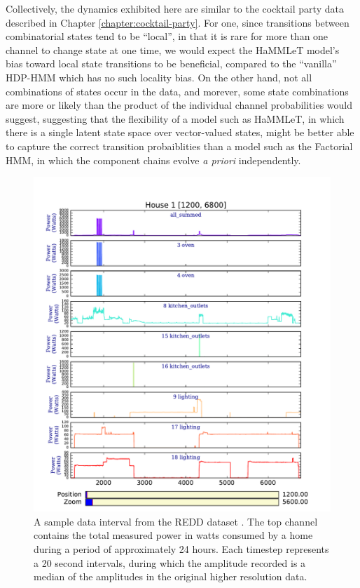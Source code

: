 Collectively, the dynamics exhibited here are similar to the cocktail party data described in Chapter \ref{chapter:cocktail-party}.  For one, since transitions between combinatorial states tend to be ``local'', in that it is rare for more than one channel to change state at one time, we would expect the HaMMLeT model's bias toward local state transitions to be beneficial, compared to the ``vanilla'' HDP-HMM which has no such locality bias.  On the other hand, not all combinations of states occur in the data, and morever, some state combinations are more or likely than the product of the individual channel probabilities would suggest, suggesting that the flexibility of a model such as HaMMLeT, in which there is a single latent state space over vector-valued states, might be better able to capture the correct transition probaiblities than a model such as the Factorial HMM, in which the component chains evolve {\em a priori} independently.

\begin{figure}[tb]
  \centering
  \includegraphics[width=\textwidth]{data/REDD/jw2013_downsampled_intervals/house_1_1200_6800/house_1_1200-6800.pdf}
  \caption{A sample data interval from the REDD dataset \cite{kolter2011redd}.  The top channel contains the total measured power in watts consumed by a home during a period of approximately 24 hours.  Each timestep represents a 20 second intervals, during which the amplitude recorded is a median of the amplitudes in the original higher resolution data.}
  \label{fig:redd-data-example}
\end{figure}

